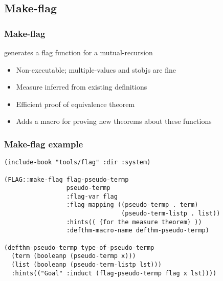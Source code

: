 \subsection{Make-flag}

\begin{frame}[fragile] 
\frametitle{Make-flag}

 generates a flag function for a mutual-recursion
\begin{itemize}
\item Non-executable; multiple-values and stobjs are fine
\item Measure inferred from existing definitions
\item Efficient proof of equivalence theorem
\item Adds a macro for proving new theorems about these functions
\end{itemize}
\end{frame}



\begin{frame}[fragile] 
\frametitle{Make-flag example}

\begin{verbatim}
(include-book "tools/flag" :dir :system)

(FLAG::make-flag flag-pseudo-termp
                 pseudo-termp
                 :flag-var flag
                 :flag-mapping ((pseudo-termp . term)
                                (pseudo-term-listp . list))
                 :hints(( {for the measure theorem} ))
                 :defthm-macro-name defthm-pseudo-termp)

(defthm-pseudo-termp type-of-pseudo-termp
  (term (booleanp (pseudo-termp x)))
  (list (booleanp (pseudo-term-listp lst)))
  :hints(("Goal" :induct (flag-pseudo-termp flag x lst))))
\end{verbatim}
\end{frame}
